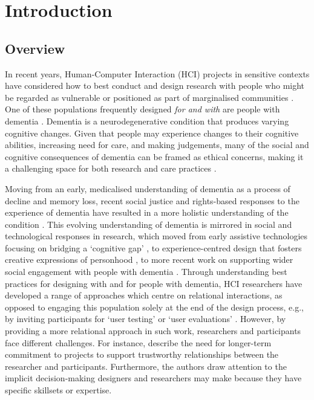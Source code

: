 \chapter{Introduction}

\section{Overview}
\label{Intro: Overiew}

In recent years, Human-Computer Interaction (HCI) projects in sensitive contexts have considered how to best conduct and design research with people who might be regarded as vulnerable or positioned as part of marginalised communities \citep{waycott_challenge_2015}. One of these populations frequently designed \textit{for and with} are people with dementia \citep{suijkerbuijk_active_2019}. Dementia is a neurodegenerative condition that produces varying cognitive changes. Given that people may experience changes to their cognitive abilities, increasing need for care, and making judgements, many of the social and cognitive consequences of dementia can be framed as ethical concerns, making it a challenging space for both research and care practices \citep{herrmann_systematic_2018}.

Moving from an early, medicalised understanding of dementia as a process of decline and memory loss, recent social justice and rights-based responses to the experience of dementia have resulted in a more holistic understanding of the condition \citep{shakespeare_rights_2019}. This evolving understanding of dementia is mirrored in social and technological responses in research, which moved from early assistive technologies focusing on bridging a ‘cognitive gap’ \citep{mulvenna_supporting_2010}, to experience-centred design that fosters creative expressions of personhood \citep{morrissey_value_2017}, to more recent work on supporting wider social engagement with people with dementia \citep{foley_care_2019, lazar_safe_2019, welsh_ticket_2018}. Through understanding best practices for designing with and for people with dementia, HCI researchers have developed a range of approaches which centre on relational interactions, as opposed to engaging this population solely at the end of the design process, e.g., by inviting participants for ‘user testing’ or ‘user evaluations’ \citep{brankaert_intersections_2019,schorch_designing_2016, vines_designing_2013}. However, by providing a more relational approach in such work, researchers and participants face different challenges. For instance, \cite{hendriks_challenges_2014} describe the need for longer-term commitment to projects to support trustworthy relationships between the researcher and participants. Furthermore, the authors draw attention to the implicit decision-making designers and researchers may make because they have specific skillsets or expertise.

